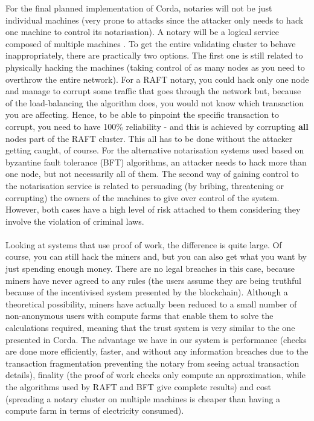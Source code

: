 \documentclass[12pt,twoside]{article}
\begin{document}
For the final planned implementation of Corda, notaries will not be just individual machines (very prone to attacks since the attacker only needs to hack one machine to control its notarisation). A notary will be a logical service composed of multiple machines \cite{attack}. To get the entire validating cluster to behave inappropriately, there are practically two options. The first one is still related to physically hacking the machines (taking control of as many nodes as you need to overthrow the entire network). For a RAFT notary, you could hack only one node and manage to corrupt some traffic that goes through the network but, because of the load-balancing the algorithm does, you would not know which transaction you are affecting. Hence, to be able to pinpoint the specific transaction to corrupt, you need to have 100\% reliability - and this is achieved by corrupting \textbf{all} nodes part of the RAFT cluster. This all has to be done without the attacker getting caught, of course. For the alternative notarisation systems used based on byzantine fault tolerance (BFT) algorithms, an attacker needs to hack more than one node, but not necessarily all of them. The second way of gaining control to the notarisation service is related to persuading (by bribing, threatening or corrupting) the owners of the machines to give over control of the system. However, both cases have a high level of risk attached to them considering they involve the violation of criminal laws. 
\\ \\
Looking at systems that use proof of work, the difference is quite large. Of course, you can still hack the miners and, but you can also get what you want by just spending enough money. There are no legal breaches in this case, because miners have never agreed to any rules (the users assume they are being truthful because of the incentivised system presented by the blockchain). Although a theoretical possibility, miners have actually been reduced to a small number of non-anonymous users with compute farms that enable them to solve the calculations required, meaning that the trust system is very similar to the one presented in Corda. The advantage we have in our system is performance (checks are done more efficiently, faster, and without any information breaches due to the transaction fragmentation preventing the notary from seeing actual transaction details), finality (the proof of work checks only compute an approximation, while the algorithms used by RAFT and BFT give complete results) and cost (spreading a notary cluster on multiple machines is cheaper than having a compute farm in terms of electricity consumed).
\end{document}

